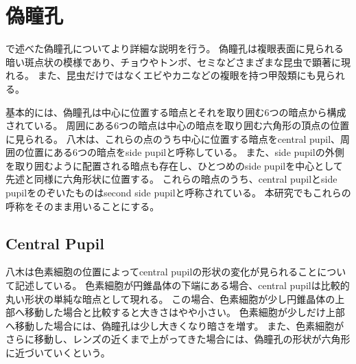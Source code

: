 \section{偽瞳孔}
\label{SPseudopupil}

で述べた偽瞳孔についてより詳細な説明を行う。
偽瞳孔は複眼表面に見られる暗い斑点状の模様であり\figref{}、チョウやトンボ、セミなどさまざまな昆虫で顕著に現れる。
また、昆虫だけではなくエビやカニなどの複眼を持つ甲殻類にも見られる。



基本的には、偽瞳孔は中心に位置する暗点とそれを取り囲む6つの暗点から構成されている。
周囲にある6つの暗点は中心の暗点を取り囲む六角形の頂点の位置に見られる。
八木\cite{yagi1951studies}は、これらの点のうち中心に位置する暗点をcentral pupil、周囲の位置にある6つの暗点をside pupilと呼称している。
また、side pupilの外側を取り囲むように配置される暗点も存在し、ひとつめのside pupilを中心として先述と同様に六角形状に位置する。
これらの暗点のうち、central pupilとside pupilをのぞいたものはsecond side pupilと呼称されている。
本研究でもこれらの呼称をそのまま用いることにする。

\subsection{Central Pupil}
\label{SSCentralPupil}

八木は色素細胞の位置によってcentral pupilの形状の変化が見られることについて記述している。
色素細胞が円錐晶体の下端にある場合、central pupilは比較的丸い形状の単純な暗点として現れる。
この場合、色素細胞が少し円錐晶体の上部へ移動した場合と比較すると大きさはやや小さい。
色素細胞が少しだけ上部へ移動した場合には、偽瞳孔は少し大きくなり暗さを増す。
また、色素細胞がさらに移動し、レンズの近くまで上がってきた場合には、偽瞳孔の形状が六角形に近づいていくという。

